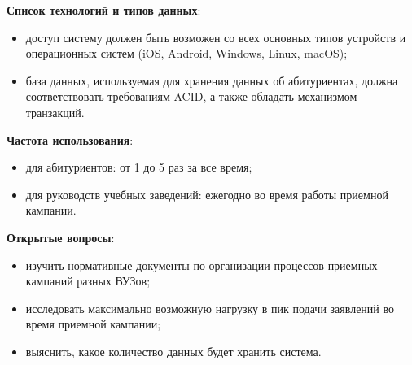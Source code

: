 \documentclass[a4paper, 14pt]{extarticle}
\begin{document}
{  \textbf{Список технологий и типов данных}:
  \begin{itemize}
    \item доступ систему должен быть возможен со всех основных типов устройств и
    операционных систем (iOS, Android, Windows, Linux, macOS);
    \item база данных, используемая для хранения данных об абитуриентах, должна
    соответствовать требованиям ACID, а также обладать механизмом транзакций.
  \end{itemize}

  \textbf{Частота использования}:
  \begin{itemize}
    \item для абитуриентов: от 1 до 5 раз за все время;
    \item для руководств учебных заведений: ежегодно во время работы приемной
    кампании.
  \end{itemize}

  \textbf{Открытые вопросы}:
  \begin{itemize}
    \item изучить нормативные документы по организации процессов приемных
    кампаний разных ВУЗов;
    \item исследовать максимально возможную нагрузку в пик подачи заявлений во
    время приемной кампании;
    \item выяснить, какое количество данных будет хранить система.
  \end{itemize}
}
\end{document}
